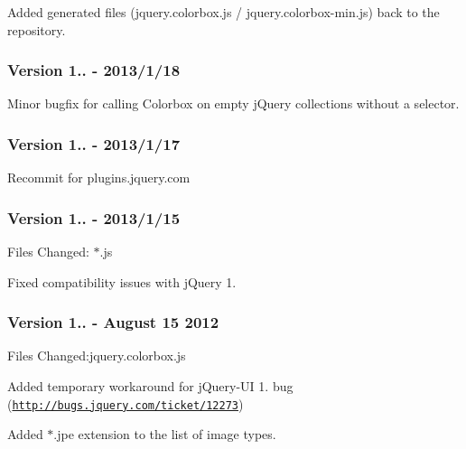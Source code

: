 \begin{DoxyItemize}
\item Added generated files (jquery.\-colorbox.\-js / jquery.\-colorbox-\/min.\-js) back to the repository.
\end{DoxyItemize}

\subsubsection*{Version 1.. -\/ 2013/1/18}


\begin{DoxyItemize}
\item Minor bugfix for calling Colorbox on empty j\-Query collections without a selector.
\end{DoxyItemize}

\subsubsection*{Version 1.. -\/ 2013/1/17}


\begin{DoxyItemize}
\item Recommit for plugins.\-jquery.\-com
\end{DoxyItemize}

\subsubsection*{Version 1.. -\/ 2013/1/15}

Files Changed\-: $\ast$.js


\begin{DoxyItemize}
\item Fixed compatibility issues with j\-Query 1.
\end{DoxyItemize}

\subsubsection*{Version 1.. -\/ August 15 2012}

Files Changed\-:jquery.\-colorbox.\-js


\begin{DoxyItemize}
\item Added temporary workaround for j\-Query-\/\-U\-I 1. bug (\href{http://bugs.jquery.com/ticket/12273}{\tt http\-://bugs.\-jquery.\-com/ticket/12273})
\item Added $\ast$.jpe extension to the list of image types.
\end{DoxyItemize}

